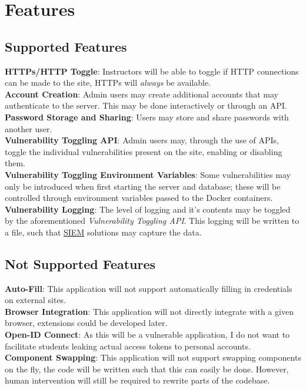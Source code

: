 \section{Features}
\subsection{Supported Features}
\noindent\textbf{HTTPs/HTTP Toggle}: Instructors will be able to toggle if HTTP connections can be made to the site, HTTPs will \textit{always} be available.\\
\noindent\textbf{Account Creation}: Admin users may create additional accounts that may authenticate to the server. This may be done interactively or through an API.\\
\noindent\textbf{Password Storage and Sharing}: Users may store and share passwords with another user.\\
\noindent\textbf{Vulnerability Toggling API}: Admin users may, through the use of APIs, toggle the individual vulnerabilities present on the site, enabling or disabling them.\\
\noindent\textbf{Vulnerability Toggling Environment Variables}: Some vulnerabilities may only be introduced when first starting the server and database; these will be controlled through environment variables passed to the Docker containers.\\
\noindent\textbf{Vulnerability Logging}: The level of logging and it's contents may be toggled by the aforementioned \textit{Vulnerability Toggling API}. This logging will be written to a file, such that \href{https://www.ibm.com/topics/siem}{SIEM} solutions may capture the data.
\subsection{Not Supported Features}
\noindent\textbf{Auto-Fill}: This application will not support automatically filling in credentials on external sites.\\
\noindent\textbf{Browser Integration}: This application will not directly integrate with a given browser, extensions could be developed later.\\
\noindent\textbf{Open-ID Connect}: As this will be a vulnerable application, I do not want to facilitate students leaking actual access tokens to personal accounts.\\
\noindent\textbf{Component Swapping}: This application will not support swapping components on the fly, the code will be written such that this can easily be done. However, human intervention will still be required to rewrite parts of the codebase.
